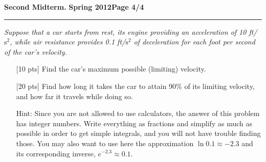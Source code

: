\documentclass[12pt]{article}
\begin{document}
\hfill{\large\bf Second Midterm.}\hfill{\large\bf
  Spring 2012}\hfill{\large\bf Page 4/4}\hrule

\bigskip
{\problem[30 pts] \em Suppose that a car starts from rest, its engine
  providing an acceleration of 10 ft/$\text{s}^2$, while air
  resistance provides 0.1 ft/$\text{s}^2$ of deceleration for each
  foot per second of the car's velocity.}
\begin{itemize}
\item[{[10 pts]}] Find the car's maximum possible (limiting) velocity.
\vspace{4cm}
\begin{flushright}
\end{flushright}
\item[{[20 pts]}] Find how long it takes the car to attain 90\% of its
  limiting velocity, and how far it travels while doing so.

\small{Hint: Since you are not allowed to use calculators, the answer
  of this problem has integer numbers.  Write everything as fractions and
  simplify as much as possible in order to get simple integrals, and
  you will not have trouble finding those.  You may also want to use
  here the approximation $\ln 0.1 \approx -2.3$ and its corresponding
  inverse, $e^{-2.3} \approx 0.1$.} 
\vspace{8cm}
\begin{flushright}
\end{flushright}
\begin{flushright}
\end{flushright}
\end{itemize}
\end{document}
